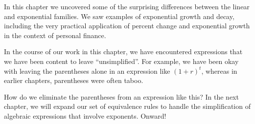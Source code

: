 %

\chaptersummary

In this chapter we uncovered some of the surprising differences between the linear and exponential families. We saw examples of exponential growth and decay, including the very practical application of percent change and exponential growth in the context of personal finance.

In the course of our work in this chapter, we have encountered expressions that we have been content to leave ``unsimplified''. For example, we have been okay with leaving the parentheses alone in an expression like $(1+r)^t$, whereas in earlier chapters, parentheses were often taboo.

How do we eliminate the parentheses from an expression like this? In the next chapter, we will expand our set of equivalence rules to handle the simplification of algebraic expressions that involve exponents. Onward!
